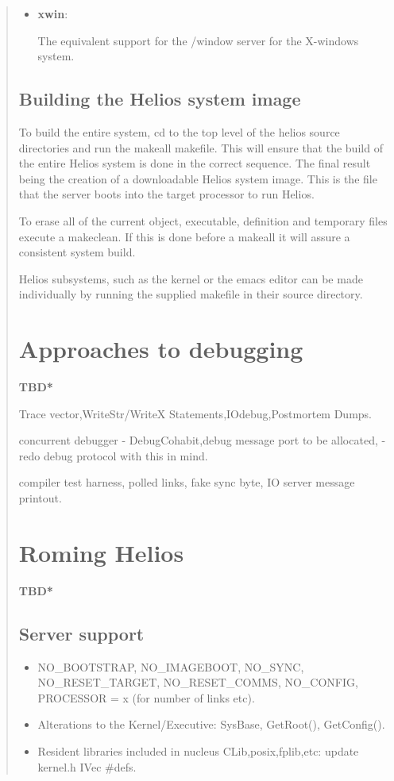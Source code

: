 \begin {quote}
\begin{itemize}
\item {\bf xwin}: 

The equivalent support for the /window server for the X-windows system.
\end{itemize}

\subsection{Building the Helios system image}

To build the entire system, cd to the top level of the helios source
directories and run the makeall makefile. This will ensure that the
build of the entire Helios system is done in the correct sequence. The final
result being the creation of a downloadable Helios system image. This is
the file that the server boots into the target processor to run Helios.

To erase all of the current object, executable, definition and temporary files
execute a makeclean. If this is done before a makeall it will assure a
consistent system build.

Helios subsystems, such as the kernel or the emacs editor can be made
individually by running the supplied makefile in their source directory.

\section{Approaches to debugging}
{\bf *TBD*}

Trace vector,WriteStr/WriteX Statements,IOdebug,Postmortem Dumps.

concurrent debugger - DebugCohabit,debug message port to be allocated,
- redo debug protocol with this in mind.

compiler test harness, polled links, fake sync byte, IO server message printout.

\section{Roming Helios}
{\bf *TBD*}

\subsection{Server support}

\begin{itemize}
\item NO\_BOOTSTRAP, NO\_IMAGEBOOT, NO\_SYNC, NO\_RESET\_TARGET, \newline
NO\_RESET\_COMMS, NO\_CONFIG, PROCESSOR = x (for number of \newline
links etc).
\item Alterations to the Kernel/Executive:
SysBase, GetRoot(), GetConfig().
\item Resident libraries included in nucleus CLib,posix,fplib,etc: update
kernel.h IVec \#defs.
\end{itemize}


\end{quote}
